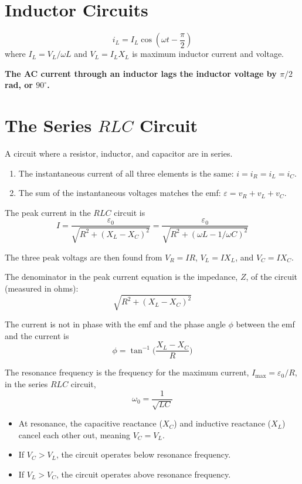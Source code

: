\documentclass{article}
\begin{document}
\section*{Inductor Circuits}
\[i_L = I_L\cos(\omega t - \frac{\pi}{2})\]
where $I_L = V_L / \omega L$ and $V_L = I_L X_L$ is maximum inductor current and voltage.
\vspace{1em}

\textbf{The AC current through an inductor lags the inductor voltage by $\pi / 2$ rad, or
$90^\circ$.}

\pagebreak

\section*{The Series $RLC$ Circuit}
A circuit where a resistor, inductor, and capacitor are in series.
\begin{enumerate}
    \item The instantaneous current of all three elements is the same: $i=i_R = i_L = i_C$.
    \item The sum of the instantaneous voltages matches the emf: $\varepsilon = v_R + v_L + v_C$.
\end{enumerate}

The peak current in the $RLC$ circuit is
\[I=\frac{\varepsilon_0}{\sqrt{R^2 + {(X_L - X_C)}^2}} = \frac{\varepsilon_0}{\sqrt{R^2 + {(\omega
L - 1 / \omega C)}^2}}\]

The three peak voltags are then found from $V_R = IR$, $V_L = IX_L$, and $V_C = IX_C$.
\vspace{1em}

The denominator in the peak current equation is the impedance, $Z$, of the circuit (measured in
ohms):
\[\sqrt{R^2 + {(X_L - X_C)}^2}\]

The current is not in phase with the emf and the phase angle $\phi$ between the emf and the current
is
\[\phi = \tan^{-1}\Bigg(\frac{X_L - X_C}{R}\Bigg)\]

The resonance frequency is the frequency for the maximum current,
$I_\text{max} = \varepsilon_0 / R$, in the series $RLC$ circuit,
\[\omega_0 = \frac{1}{\sqrt{LC}}\]

\begin{itemize}
    \item At resonance, the capacitive reactance ($X_C$) and inductive reactance ($X_L$) cancel
    each other out, meaning $V_C=V_L$.
    \item If $V_C > V_L$, the circuit operates below resonance frequency.
    \item If $V_L > V_C$, the circuit operates above resonance frequency.
\end{itemize}
\end{document}
